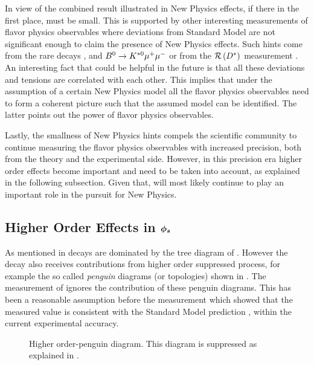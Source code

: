 In view of the combined \phis result illustrated in  New Physics effects, if there in the first place, must be small.
This is supported by other interesting measurements of flavor physics observables where deviations from Standard Model are not significant enough
to claim the presence of New Physics effects. Such hints come from the rare decays \Bsmm, \Bdmm \cite{CMS:2014xfa} and $B^0 \rightarrow K^{*0} \mu^+\mu^-$\cite{Aaij:2015oid}
or from the $\mathcal{R}\left(D^*\right)$ measurement \cite{Aaij:2015yra}.
An interesting fact that could be helpful in the future is that all these deviations and tensions are
correlated with each other. This implies that under the assumption of a certain New Physics model all the flavor physics
observables need to form a coherent picture such that the assumed model can be identified.
The latter points out the power of flavor physics observables.

Lastly, the smallness of New Physics hints compels the scientific community to continue measuring the
flavor physics observables with increased precision, both from the theory and the experimental side.
However, in this precision era higher order effects become important and need to be taken into account,
as explained in the following subsection. Given that, \phis will most likely continue to play an important
role in the pursuit for New Physics.

\subsection{Higher Order Effects in $\boldsymbol{\phi_{s}}$}
\label{TheBsJpsiKstDecay}
As mentioned in  \BsJpsiPhi decays are dominated by the tree diagram of .
However the decay also receives contributions from higher order suppressed process, for example the so called
{\it penguin} diagrams (or topologies) shown in . The \phis measurement of 
ignores the contribution of these penguin diagrams. This has been a reasonable assumption before the \lhcb measurement
which showed that the measured  value is consistent with the Standard Model prediction ,
within the current experimental accuracy.

\begin{figure}[h]
  \centering
  {\sffamily }
  \caption{ Higher order-penguin diagram. This diagram is suppressed as explained in .}
  \label{bs2jpsiphi_peng}
\end{figure}

